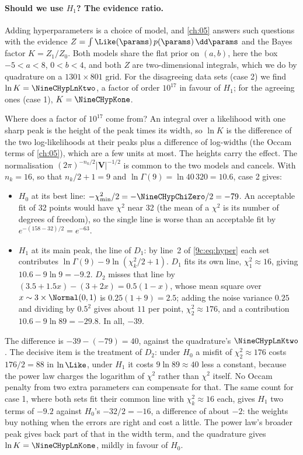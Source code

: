 \paragraph{Should we use $H_1$? The evidence ratio.} Adding hyperparameters is a choice of model, and
\cref{ch:05} answers such questions with the evidence $Z=\int\Like(\params)\,p(\params)\,\dd\params$ and the
Bayes factor $K=Z_1/Z_0$. Both models share the flat prior on $(a,b)$, here the box
$-5<a<8$, $0<b<4$, and both $Z$ are two-dimensional integrals, which we do by quadrature on a
$1301\times801$ grid. For the disagreeing data sets (case 2) we find $\ln K=\NineCHypLnKtwo$, a factor of
order $10^{17}$ in favour of $H_1$; for the agreeing ones (case 1), $K=\NineCHypKone$.

Where does a factor of $10^{17}$ come from? An integral over a likelihood with one sharp peak is the height
of the peak times its width, so $\ln K$ is the difference of the two log-likelihoods at their peaks plus a
difference of log-widths (the Occam terms of \cref{ch:05}), which are a few units at most. The heights carry
the effect. The normalisation $(2\pi)^{-n_k/2}|\mathbf V|^{-1/2}$ is common to the two models and cancels. With
$n_k=16$, so that $n_k/2+1=9$ and $\ln\Gamma(9)=\ln40\,320=10.6$, case 2 gives:
\begin{itemize}[itemsep=1pt]
  \item $H_0$ at its best line: $-\chi^2_{\min}/2=-\NineCHypChiZero/2=-79$. An acceptable fit of 32 points
        would have $\chi^2$ near 32 (the mean of a $\chi^2$ is its number of degrees of freedom), so the single
        line is worse than an acceptable fit by $e^{-(158-32)/2}=e^{-63}$.
  \item $H_1$ at its main peak, the line of $D_1$: by line~2 of \eqref{9c:eq:hyper} each set contributes
        $\ln\Gamma(9)-9\ln(\chi^2_k/2+1)$. $D_1$ fits its own line, $\chi^2_1\approx16$, giving
        $10.6-9\ln9=-9.2$. $D_2$ misses that line by $(3.5+1.5x)-(3+2x)=0.5(1-x)$, whose mean square over
        $x\sim3\times\Normal(0,1)$ is $0.25(1+9)=2.5$; adding the noise variance $0.25$ and dividing by $0.5^2$
        gives about $11$ per point, $\chi^2_2\approx176$, and a contribution $10.6-9\ln89=-29.8$. In all, $-39$.
\end{itemize}
The difference is $-39-(-79)=40$, against the quadrature's $\NineCHypLnKtwo$. The decisive item is the
treatment of $D_2$: under $H_0$ a misfit of $\chi^2_2\approx176$ costs $176/2=88$ in $\ln\Like$, under $H_1$ it
costs $9\ln89\approx40$ less a constant, because the power law charges the logarithm of $\chi^2$ rather than
$\chi^2$ itself. No Occam penalty from two extra parameters can compensate for that. The same count for case 1,
where both sets fit their common line with $\chi^2_k\approx16$ each, gives $H_1$ two terms of $-9.2$
against $H_0$'s $-32/2=-16$, a difference of about $-2$: the weights buy nothing when the errors are right
and cost a little. The power law's broader peak gives back part of that in the width term, and the quadrature
gives $\ln K=\NineCHypLnKone$, mildly in favour of $H_0$.


